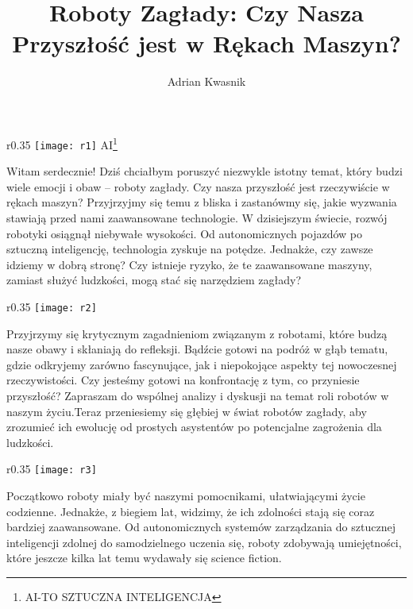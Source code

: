 \documentclass[9pt]{beamer}
\title{Roboty Zagłady: Czy Nasza Przyszłość jest w Rękach Maszyn?}
\author{Adrian Kwasnik}
\begin{document}
\begin{frame}
\titlepage
\end{frame}




\begin{frame}
\label{r1}
\begin{wrapfigure}{r}{0.35\textwidth}
\texttt{[image: r1]}
AI\footnote{AI-TO SZTUCZNA INTELIGENCJA}
\end{wrapfigure}

Witam serdecznie! Dziś chciałbym poruszyć niezwykle istotny temat, który budzi wiele emocji i obaw – roboty zagłady. Czy nasza przyszłość jest rzeczywiście w rękach maszyn? Przyjrzyjmy się temu z bliska i zastanówmy się, jakie wyzwania stawiają przed nami zaawansowane technologie.
W dzisiejszym świecie, rozwój robotyki osiągnął niebywałe wysokości. Od autonomicznych pojazdów po sztuczną inteligencję, technologia zyskuje na potędze. Jednakże, czy zawsze idziemy w dobrą stronę? Czy istnieje ryzyko, że te zaawansowane maszyny, zamiast służyć ludzkości, mogą stać się narzędziem zagłady?

\end{frame}




\begin{frame}
\label{r2}
\begin{wrapfigure}{r}{0.35\textwidth}
\texttt{[image: r2]}

\end{wrapfigure}

Przyjrzymy się krytycznym zagadnieniom związanym z robotami, które budzą nasze obawy i skłaniają do refleksji. Bądźcie gotowi na podróż w głąb tematu, gdzie odkryjemy zarówno fascynujące, jak i niepokojące aspekty tej nowoczesnej rzeczywistości. Czy jesteśmy gotowi na konfrontację z tym, co przyniesie przyszłość? Zapraszam do wspólnej analizy i dyskusji na temat roli robotów w naszym życiu.Teraz przeniesiemy się głębiej w świat robotów zagłady, aby zrozumieć ich ewolucję od prostych asystentów po potencjalne zagrożenia dla ludzkości.

\end{frame}




\begin{frame}
\label{r3}
\begin{wrapfigure}{r}{0.35\textwidth}
\texttt{[image: r3]}

\end{wrapfigure}

Początkowo roboty miały być naszymi pomocnikami, ułatwiającymi życie codzienne. Jednakże, z biegiem lat, widzimy, że ich zdolności stają się coraz bardziej zaawansowane. Od autonomicznych systemów zarządzania do sztucznej inteligencji zdolnej do samodzielnego uczenia się, roboty zdobywają umiejętności, które jeszcze kilka lat temu wydawały się science fiction.

\end{frame}
\end{document}
